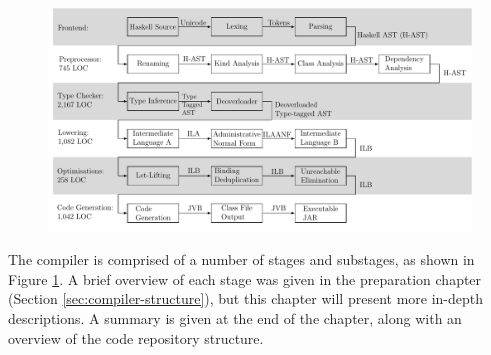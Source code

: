 \documentclass[dissertation.tex]{subfiles}
\begin{document}
\begin{figure}[h]
    \includegraphics[width=\textwidth]{figures/compiler_layout.pdf}
    \caption{}
    \label{fig:compiler-layout}
\end{figure}

The compiler is comprised of a number of stages and substages, as shown in Figure \ref{fig:compiler-layout}. A brief overview of each stage was given in the preparation chapter (Section \ref{sec:compiler-structure}), but this chapter will present more in-depth descriptions. A summary is given at the end of the chapter, along with an overview of the code repository structure.
\end{document}
